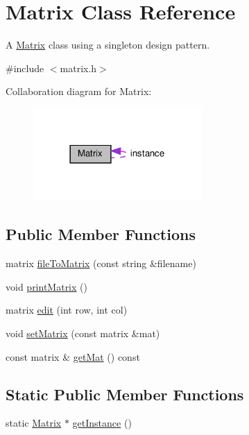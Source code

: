 \hypertarget{class_matrix}{}\section{Matrix Class Reference}
\label{class_matrix}


A \hyperlink{class_matrix}{Matrix} class using a singleton design pattern.  




{\ttfamily \#include $<$matrix.\+h$>$}



Collaboration diagram for Matrix\+:\nopagebreak
\begin{figure}[H]
\begin{center}
\leavevmode
\includegraphics[width=182pt]{class_matrix__coll__graph}
\end{center}
\end{figure}
\subsection*{Public Member Functions}
\begin{DoxyCompactItemize}
\item 
matrix \hyperlink{class_matrix_a35eb9dcb01c552fea1f5926db35339ef}{file\+To\+Matrix} (const string \&filename)
\item 
void \hyperlink{class_matrix_aa1967ad240a5ffaf492800044b7275d9}{print\+Matrix} ()
\item 
matrix \hyperlink{class_matrix_a34b2269a2b6d06c202439de2e64009ba}{edit} (int row, int col)
\item 
void \hyperlink{class_matrix_a8c45dd1354fa25e14065cab23f3074c0}{set\+Matrix} (const matrix \&mat)
\item 
const matrix \& \hyperlink{class_matrix_a52d82641f52304c9b6525747cd7f960c}{get\+Mat} () const
\end{DoxyCompactItemize}
\subsection*{Static Public Member Functions}
\begin{DoxyCompactItemize}
\item 
static \hyperlink{class_matrix}{Matrix} $\ast$ \hyperlink{class_matrix_a0c8e09a50ddb4d068d39456ea130abcc}{get\+Instance} ()
\end{DoxyCompactItemize}
